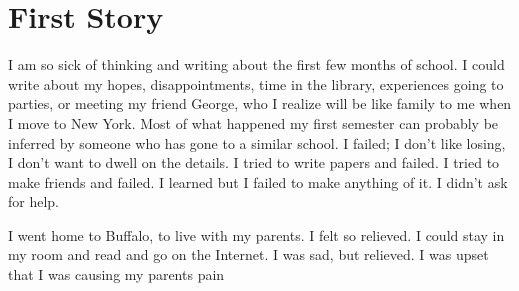\documentclass[12pt]{article}
\begin{document}
\section{First Story}
I am so sick of thinking and writing about the first few months of school.  I
could write about my hopes, disappointments, time in the library, experiences
going to parties, or meeting my friend George, who I realize will be like family
to me when I move to New York.  Most of what happened my first semester can
probably be inferred by someone who has gone to a similar school.  I failed; I
don't like losing, I don't want to dwell on the details.  I tried to write
papers and failed.  I tried to make friends and failed.  I learned but I failed
to make anything of it.  I didn't ask for help.

I went home to Buffalo, to live with my parents.  I felt so relieved.  I could
stay in my room and read and go on the Internet.  I was sad, but relieved.  I
was upset that I was causing my parents pain
\end{document}
